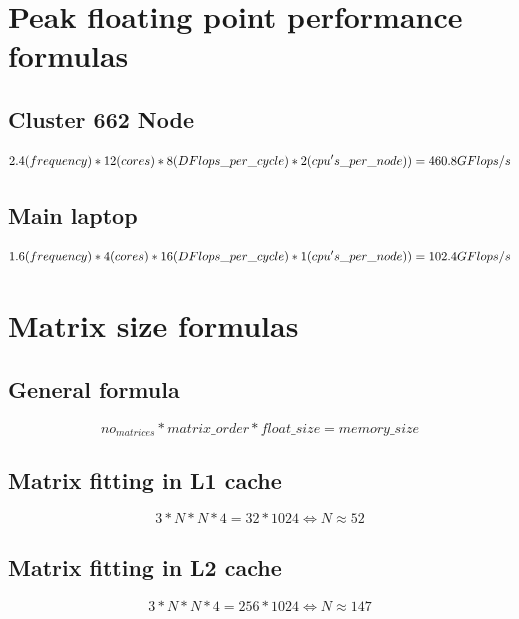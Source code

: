 \documentclass{article}
\begin{document}
\begin{appendices}
\section{Peak floating point performance formulas}
\subsection{Cluster 662 Node}
\begin{equation}
2.4 (frequency) * 12 (cores) * 8 (DFlops\_per\_cycle) * 2 (cpu's\_per\_node)) = 460.8 GFlops/s \\
\end{equation}

\subsection{Main laptop}
\label{main_laptop_flop}
\begin{equation}
1.6 (frequency) * 4 (cores) * 16 (DFlops\_per\_cycle) * 1 (cpu's\_per\_node)) = 102.4 GFlops/s \\
\end{equation}

\section{Matrix size formulas}
\subsection{General formula}
\label{general_mem_formula}
\begin{equation}
no_{matrices} * matrix\_order * float\_size = memory\_size 
\end{equation}

\subsection{Matrix fitting in L1 cache}
\begin{equation}
3*N*N*4 = 32 * 1024 \Leftrightarrow N \approx 52 
\end{equation}

\subsection{Matrix fitting in L2 cache}
\begin{equation}
3*N*N*4 = 256*1024 \Leftrightarrow N \approx 147 
\end{equation}


\end{appendices}
\end{document}
